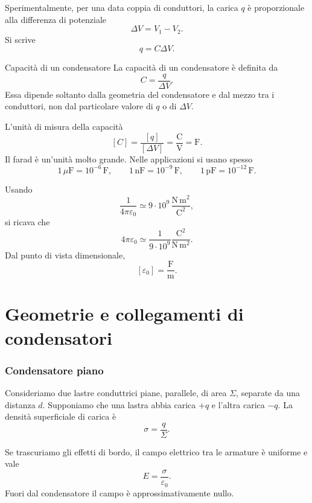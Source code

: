 \documentclass[a4paper]{article}
\begin{document}
Sperimentalmente, per una data coppia di conduttori, la carica \(q\) è proporzionale alla differenza di potenziale
\[
    \Delta V=V_1-V_2.
\]
Si scrive
\[
    q=C\Delta V.
\]

\begin{snippetdefinition}{Capacità di un condensatore}
    La capacità di un condensatore è definita da
    \[
        C=\frac{q}{\Delta V}.
    \]
    Essa dipende soltanto dalla geometria del condensatore e dal mezzo tra i conduttori, non dal particolare valore di \(q\) o di \(\Delta V\).
\end{snippetdefinition}

L'unità di misura della capacità
\[
    [C]=\frac{[q]}{[\Delta V]}=\frac{\mathrm{C}}{\mathrm{V}}=\mathrm{F}.
\]
Il farad è un'unità molto grande. Nelle applicazioni si usano spesso
\[
    1\,\mu\mathrm{F}=10^{-6}\,\mathrm{F},
    \qquad
    1\,\mathrm{nF}=10^{-9}\,\mathrm{F},
    \qquad
    1\,\mathrm{pF}=10^{-12}\,\mathrm{F}.
\]

Usando
\[
    \frac{1}{4\pi\varepsilon_0}\simeq 9\cdot 10^9\,\frac{\mathrm{N}\,\mathrm{m}^2}{\mathrm{C}^2},
\]
si ricava che
\[
    4\pi\varepsilon_0\simeq \frac{1}{9\cdot10^9}\frac{\mathrm{C}^2}{\mathrm{N}\,\mathrm{m}^2}.
\]
Dal punto di vista dimensionale,
\[
    [\varepsilon_0]=\frac{\mathrm{F}}{\mathrm{m}}.
\]

\pagebreak
\part{Geometrie e collegamenti di condensatori}

\section{Condensatore piano}

Consideriamo due lastre conduttrici piane, parallele, di area \(\Sigma\), separate da una distanza \(d\). Supponiamo che una lastra abbia carica \(+q\) e l'altra carica \(-q\). La densità superficiale di carica è
\[
    \sigma=\frac{q}{\Sigma}.
\]

Se trascuriamo gli effetti di bordo, il campo elettrico tra le armature è uniforme e vale
\[
    E=\frac{\sigma}{\varepsilon_0}.
\]
Fuori dal condensatore il campo è approssimativamente nullo.

\begin{center}
\end{center}
\end{document}

